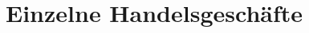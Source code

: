 \documentclass[11pt]{article}
\begin{document}
\chapter[Einzelne Handelsgeschäfte]{Einzelne Handelsgeschäfte}

    \section[]{}
    
\end{document}

